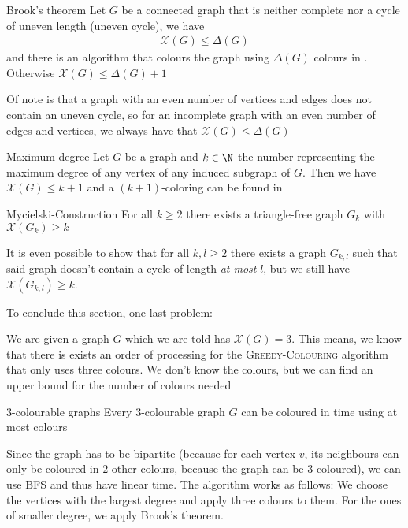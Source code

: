 \begin{theorem}[]{Brook's theorem}
    Let $G$ be a connected graph that is neither complete nor a cycle of uneven length (uneven cycle), we have
    \begin{align*}
        \mathscr{X}(G) \leq \Delta(G)
    \end{align*}
    and there is an algorithm that colours the graph using $\Delta(G)$ colours in . Otherwise $\mathscr{X}(G) \leq \Delta(G) + 1$
\end{theorem}
Of note is that a graph with an even number of vertices and edges does not contain an uneven cycle, so for an incomplete graph with an even number of edges and vertices, we always have that $\mathscr{X}(G) \leq \Delta(G)$

\begin{theorem}[]{Maximum degree}
    Let $G$ be a graph and $k \in \N$ the number representing the maximum degree of any vertex of any induced subgraph of $G$. Then we have $\mathscr{X}(G) \leq k + 1$ and a $(k + 1)$-coloring can be found in 
\end{theorem}

\begin{theorem}[]{Mycielski-Construction}
    For all $k \geq 2$ there exists a triangle-free graph $G_k$ with $\mathscr{X}(G_k) \geq k$
\end{theorem}
It is even possible to show that for all $k, l \geq 2$ there exists a graph $G_{k, l}$ such that said graph doesn't contain a cycle of length \textit{at most} $l$, but we still have $\mathscr{X}(G_{k, l}) \geq k$.

To conclude this section, one last problem:

We are given a graph $G$ which we are told has $\mathscr{X}(G) = 3$. This means, we know that there is exists an order of processing for the \textsc{Greedy-Colouring} algorithm that only uses three colours. We don't know the colours, but we can find an upper bound for the number of colours needed
\begin{theorem}[]{$3$-colourable graphs}
    Every $3$-colourable graph $G$ can be coloured in time  using at most  colours
\end{theorem}
Since the graph has to be bipartite (because for each vertex $v$, its neighbours can only be coloured in $2$ other colours, because the graph can be $3$-coloured), we can use BFS and thus have linear time. The algorithm works as follows: We choose the vertices with the largest degree and apply three colours to them. For the ones of smaller degree, we apply Brook's theorem.
